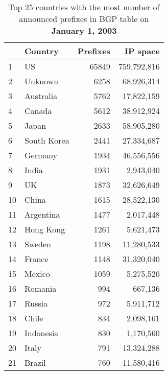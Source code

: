 \begin{table*}[p]
\begin{minipage}[t]{0.48\textwidth}
	\begin{center}
	\caption{Top 25 countries with the most number of announced prefixes in BGP table on \textbf{January 1, 2003}}
	\label{tab:top25 bgp prefixes 2003}
	\begin{tabular}{|l||l|r|r|}
		\hline
		&      \bf Country		&    Prefixes   &       IP space 		\tabularnewline \hline 
1       &       US      		&       65849   &       759,792,816     \tabularnewline \hline
2       &       Unknown			&       6258    &       68,926,314      \tabularnewline \hline
3       &       Australia       &       5762    &       17,822,159      \tabularnewline \hline
4       &       Canada  		&       5612    &       38,912,924      \tabularnewline \hline
5       &       Japan   		&       2633    &       58,905,280      \tabularnewline \hline
6       &       South Korea     &       2441    &       27,334,687      \tabularnewline \hline
7       &       Germany			&       1934    &       46,556,556      \tabularnewline \hline
8       &       India  			&       1931    &       2,943,040       \tabularnewline \hline
9       &       UK     			&       1873    &       32,626,649      \tabularnewline \hline
10      &       China  			&       1615    &       28,522,130      \tabularnewline \hline
11      &       Argentina       &       1477    &       2,017,448       \tabularnewline \hline
12      &       Hong Kong       &       1261    &       5,621,473       \tabularnewline \hline
13      &       Sweden  		&       1198    &       11,280,533      \tabularnewline \hline
14      &       France  		&       1148    &       31,320,040      \tabularnewline \hline
15      &       Mexico  		&       1059    &       5,275,520       \tabularnewline \hline
16      &       Romania 		&       994     &       667,136 		\tabularnewline \hline
17      &       Russia  		&       972     &       5,911,712       \tabularnewline \hline
18      &       Chile   		&       834     &       2,098,161       \tabularnewline \hline
19      &       Indonesia       &       830     &       1,170,560       \tabularnewline \hline
20      &       Italy   		&       791     &       13,324,288      \tabularnewline \hline
21      &       Brazil  		&       760     &       11,580,416      \tabularnewline \hline

\end{tabular}
\end{center}
\end{minipage}
\end{table*}
